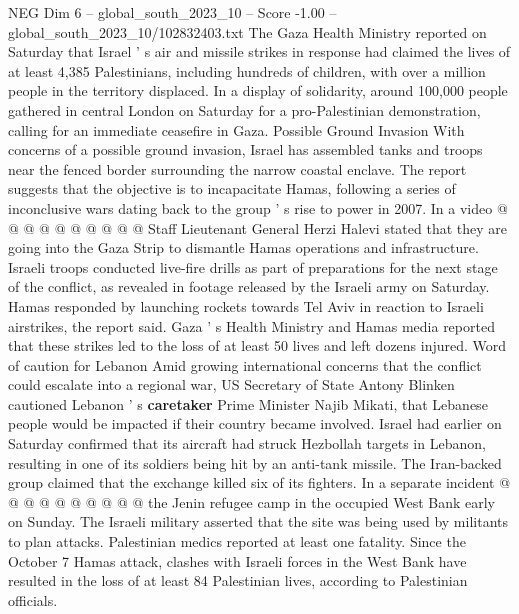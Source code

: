 \begin{textsample}{NEG Dim 6 – global\_south\_2023\_10 – Score -1.00 – global\_south\_2023\_10/102832403.txt}
The Gaza Health Ministry reported on Saturday that Israel ' s air and missile strikes in response had claimed the lives of at least 4,385 Palestinians, including hundreds of children, with over a million people in the territory displaced.
In a display of solidarity, around 100,000 people gathered in central London on Saturday for a pro-Palestinian demonstration, calling for an immediate ceasefire in Gaza.
Possible Ground Invasion With concerns of a possible ground invasion, Israel has assembled tanks and troops near the fenced border surrounding the narrow coastal enclave.
The report suggests that the objective is to incapacitate Hamas, following a series of inconclusive wars dating back to the group ' s rise to power in 2007.
In a video @ @ @ @ @ @ @ @ @ @ Staff Lieutenant General Herzi Halevi stated that they are going into the Gaza Strip to dismantle Hamas operations and infrastructure.
Israeli troops conducted live-fire drills as part of preparations for the next stage of the conflict, as revealed in footage released by the Israeli army on Saturday.
Hamas responded by launching rockets towards Tel Aviv in reaction to Israeli airstrikes, the report said.
Gaza ' s Health Ministry and Hamas media reported that these strikes led to the loss of at least 50 lives and left dozens injured.
Word of caution for Lebanon Amid growing international concerns that the conflict could escalate into a regional war, US Secretary of State Antony Blinken cautioned Lebanon ' s \textbf{caretaker} Prime Minister Najib Mikati, that Lebanese people would be impacted if their country became involved.
Israel had earlier on Saturday confirmed that its aircraft had struck Hezbollah targets in Lebanon, resulting in one of its soldiers being hit by an anti-tank missile.
The Iran-backed group claimed that the exchange killed six of its fighters.
In a separate incident @ @ @ @ @ @ @ @ @ @ the Jenin refugee camp in the occupied West Bank early on Sunday.
The Israeli military asserted that the site was being used by militants to plan attacks.
Palestinian medics reported at least one fatality.
Since the October 7 Hamas attack, clashes with Israeli forces in the West Bank have resulted in the loss of at least 84 Palestinian lives, according to Palestinian officials.

\end{textsample}
